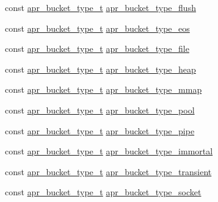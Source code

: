 \begin{DoxyCompactItemize}
\item 
const \hyperlink{structapr__bucket__type__t}{apr\-\_\-bucket\-\_\-type\-\_\-t} \hyperlink{group___a_p_r___util___bucket___brigades_gaecc113cfcc7751dfe70876437a2f51d7}{apr\-\_\-bucket\-\_\-type\-\_\-flush}
\item 
const \hyperlink{structapr__bucket__type__t}{apr\-\_\-bucket\-\_\-type\-\_\-t} \hyperlink{group___a_p_r___util___bucket___brigades_ga829cac9b4843b85a902ddd64dffbfb12}{apr\-\_\-bucket\-\_\-type\-\_\-eos}
\item 
const \hyperlink{structapr__bucket__type__t}{apr\-\_\-bucket\-\_\-type\-\_\-t} \hyperlink{group___a_p_r___util___bucket___brigades_ga5f17aa7e616179411a06475ec09626e9}{apr\-\_\-bucket\-\_\-type\-\_\-file}
\item 
const \hyperlink{structapr__bucket__type__t}{apr\-\_\-bucket\-\_\-type\-\_\-t} \hyperlink{group___a_p_r___util___bucket___brigades_ga2c5608267ed7b860657f5a1c89c2f40d}{apr\-\_\-bucket\-\_\-type\-\_\-heap}
\item 
const \hyperlink{structapr__bucket__type__t}{apr\-\_\-bucket\-\_\-type\-\_\-t} \hyperlink{group___a_p_r___util___bucket___brigades_ga63f9ce8e4d6e796921aad14a218a3b23}{apr\-\_\-bucket\-\_\-type\-\_\-mmap}
\item 
const \hyperlink{structapr__bucket__type__t}{apr\-\_\-bucket\-\_\-type\-\_\-t} \hyperlink{group___a_p_r___util___bucket___brigades_ga87bace819fdbf07c12497a8289b3567b}{apr\-\_\-bucket\-\_\-type\-\_\-pool}
\item 
const \hyperlink{structapr__bucket__type__t}{apr\-\_\-bucket\-\_\-type\-\_\-t} \hyperlink{group___a_p_r___util___bucket___brigades_ga334a875abb2908364a40abbfa80c401f}{apr\-\_\-bucket\-\_\-type\-\_\-pipe}
\item 
const \hyperlink{structapr__bucket__type__t}{apr\-\_\-bucket\-\_\-type\-\_\-t} \hyperlink{group___a_p_r___util___bucket___brigades_ga391ac24b2c85969e8efa504588b364bb}{apr\-\_\-bucket\-\_\-type\-\_\-immortal}
\item 
const \hyperlink{structapr__bucket__type__t}{apr\-\_\-bucket\-\_\-type\-\_\-t} \hyperlink{group___a_p_r___util___bucket___brigades_ga1692ced61c1966e67adc05ec2a69ce9b}{apr\-\_\-bucket\-\_\-type\-\_\-transient}
\item 
const \hyperlink{structapr__bucket__type__t}{apr\-\_\-bucket\-\_\-type\-\_\-t} \hyperlink{group___a_p_r___util___bucket___brigades_gaa6d9978cc10895bdf0a4686728822a84}{apr\-\_\-bucket\-\_\-type\-\_\-socket}
\end{DoxyCompactItemize}


